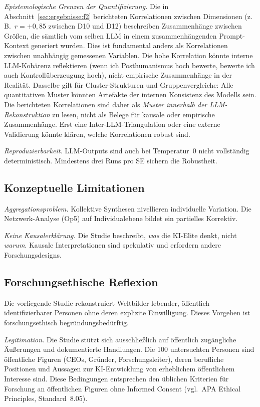 \documentclass[12pt,a4paper]{article}
\begin{document}
\emph{Epistemologische Grenzen der Quantifizierung.} Die in Abschnitt~\ref{sec:ergebnisse:f2} berichteten Korrelationen zwischen Dimensionen (z.\,B.\ $r = +0{,}85$ zwischen D10 und D12) beschreiben Zusammenh\"ange zwischen Gr\"o\ss{}en, die s\"amtlich vom selben LLM in einem zusammenh\"angenden Prompt-Kontext generiert wurden. Dies ist fundamental anders als Korrelationen zwischen unabh\"angig gemessenen Variablen. Die hohe Korrelation k\"onnte interne LLM-Koh\"arenz reflektieren (\glqq wenn ich Posthumanismus hoch bewerte, bewerte ich auch Kontroll\"uberzeugung hoch\grqq), nicht empirische Zusammenh\"ange in der Realit\"at. Dasselbe gilt f\"ur Cluster-Strukturen und Gruppenvergleiche: Alle quantitativen Muster k\"onnten Artefakte der internen Konsistenz des Modells sein. Die berichteten Korrelationen sind daher als \emph{Muster innerhalb der LLM-Rekonstruktion} zu lesen, nicht als Belege f\"ur kausale oder empirische Zusammenh\"ange. Erst eine Inter-LLM-Triangulation oder eine externe Validierung k\"onnte kl\"aren, welche Korrelationen robust sind.

\emph{Reproduzierbarkeit.} LLM-Outputs sind auch bei Temperatur~0 nicht vollst\"andig deterministisch. Mindestens drei Runs pro SE sichern die Robustheit.


\subsection{Konzeptuelle Limitationen}

\emph{Aggregationsproblem.} Kollektive Synthesen nivellieren individuelle Variation. Die Netzwerk-Analyse (Op5) auf Individualebene bildet ein partielles Korrektiv.

\emph{Keine Kausalerkl\"arung.} Die Studie beschreibt, \emph{was} die KI-Elite denkt, nicht \emph{warum}. Kausale Interpretationen sind spekulativ und erfordern andere Forschungsdesigns.

\subsection{Forschungsethische Reflexion}

Die vorliegende Studie rekonstruiert Weltbilder lebender, \"offentlich identifizierbarer Personen ohne deren explizite Einwilligung. Dieses Vorgehen ist forschungsethisch begr\"undungsbed\"urftig.

\emph{Legitimation.} Die Studie st\"utzt sich ausschlie\ss{}lich auf \"offentlich zug\"angliche \"Au\ss{}erungen und dokumentierte Handlungen. Die 100 untersuchten Personen sind \"offentliche Figuren (CEOs, Gr\"under, Forschungsleiter), deren berufliche Positionen und Aussagen zur KI-Entwicklung von erheblichem \"offentlichem Interesse sind. Diese Bedingungen entsprechen den \"ublichen Kriterien f\"ur Forschung an \"offentlichen Figuren ohne Informed Consent (vgl.\ APA Ethical Principles, Standard~8.05).
\end{document}
